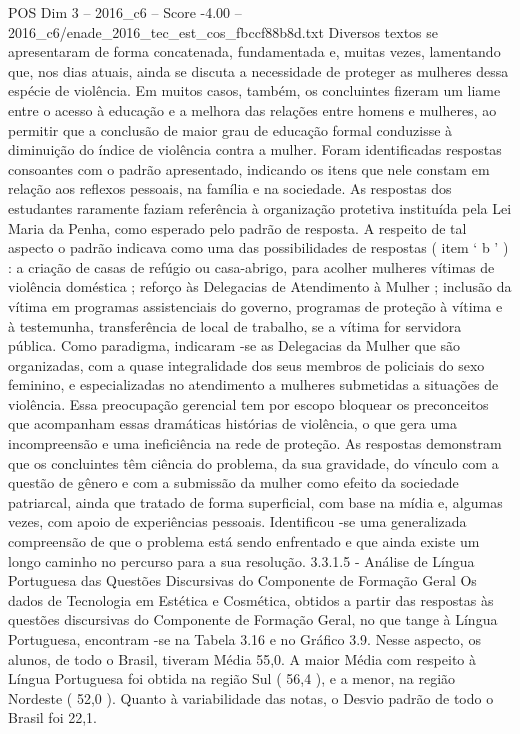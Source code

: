 \begin{textsample}{POS Dim 3 – 2016\_c6 – Score -4.00 – 2016\_c6/enade\_2016\_tec\_est\_cos\_fbccf88b8d.txt}
Diversos textos se apresentaram de forma concatenada, fundamentada e, muitas vezes, lamentando que, nos dias atuais, ainda se discuta a necessidade de proteger as mulheres dessa espécie de violência.
Em muitos casos, também, os concluintes fizeram um liame entre o acesso à educação e a melhora das relações entre homens e mulheres, ao permitir que a conclusão de maior grau de educação formal conduzisse à diminuição do índice de violência contra a mulher.
Foram identificadas respostas consoantes com o padrão apresentado, indicando os itens que nele constam em relação aos reflexos pessoais, na família e na sociedade.
As respostas dos estudantes raramente faziam referência à organização protetiva instituída pela Lei Maria da Penha, como esperado pelo padrão de resposta.
A respeito de tal aspecto o padrão indicava como uma das possibilidades de respostas ( item ‘ b ’ ) : a criação de casas de refúgio ou casa-abrigo, para acolher mulheres vítimas de violência doméstica ; reforço às Delegacias de Atendimento à Mulher ; inclusão da vítima em programas assistenciais do governo, programas de proteção à vítima e à testemunha, transferência de local de trabalho, se a vítima for servidora pública.
Como paradigma, indicaram -se as Delegacias da Mulher que são organizadas, com a quase integralidade dos seus membros de policiais do sexo feminino, e especializadas no atendimento a mulheres submetidas a situações de violência.
Essa preocupação gerencial tem por escopo bloquear os preconceitos que acompanham essas dramáticas histórias de violência, o que gera uma incompreensão e uma ineficiência na rede de proteção.
As respostas demonstram que os concluintes têm ciência do problema, da sua gravidade, do vínculo com a questão de gênero e com a submissão da mulher como efeito da sociedade patriarcal, ainda que tratado de forma superficial, com base na mídia e, algumas vezes, com apoio de experiências pessoais.
Identificou -se uma generalizada compreensão de que o problema está sendo enfrentado e que ainda existe um longo caminho no percurso para a sua resolução. 3.3.1.5 - Análise de Língua Portuguesa das Questões Discursivas do Componente de Formação Geral Os dados de Tecnologia em Estética e Cosmética, obtidos a partir das respostas às questões discursivas do Componente de Formação Geral, no que tange à Língua Portuguesa, encontram -se na Tabela 3.16 e no Gráfico 3.9.
Nesse aspecto, os alunos, de todo o Brasil, tiveram Média 55,0.
A maior Média com respeito à Língua Portuguesa foi obtida na região Sul ( 56,4 ), e a menor, na região Nordeste ( 52,0 ).
Quanto à variabilidade das notas, o Desvio padrão de todo o Brasil foi 22,1.

\end{textsample}
